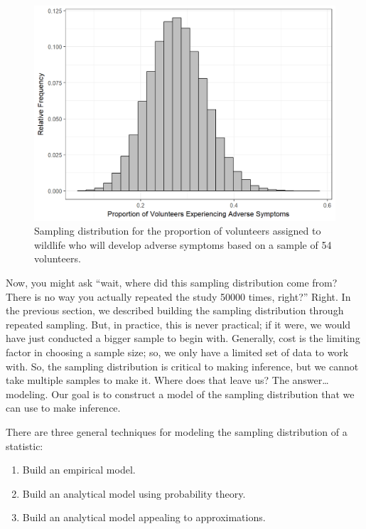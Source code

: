 \documentclass[]{book}
\providecommand{\tightlist}{%
  \setlength{\itemsep}{0pt}\setlength{\parskip}{0pt}}
\theoremstyle{definition}
\theoremstyle{definition}
\theoremstyle{definition}
\theoremstyle{remark}
\begin{document}
\begin{figure}

{\centering \includegraphics[width=0.8\linewidth]{./Images/samplingdistns-deepwater-histogram-1} 

}

\caption{Sampling distribution for the proportion of volunteers assigned to wildlife who will develop adverse symptoms based on a sample of 54 volunteers.}\label{fig:samplingdistns-deepwater-histogram}
\end{figure}

Now, you might ask ``wait, where did this sampling distribution come
from? There is no way you actually repeated the study 50000 times,
right?'' Right. In the previous section, we described building the
sampling distribution through repeated sampling. But, in practice, this
is never practical; if it were, we would have just conducted a bigger
sample to begin with. Generally, cost is the limiting factor in choosing
a sample size; so, we only have a limited set of data to work with. So,
the sampling distribution is critical to making inference, but we cannot
take multiple samples to make it. Where does that leave us? The
answer\ldots{}modeling. Our goal is to construct a model of the sampling
distribution that we can use to make inference.

There are three general techniques for modeling the sampling
distribution of a statistic:

\begin{enumerate}
\def\labelenumi{\arabic{enumi}.}
\tightlist
\item
  Build an empirical model.
\item
  Build an analytical model using probability theory.
\item
  Build an analytical model appealing to approximations.
\end{enumerate}
\end{document}
